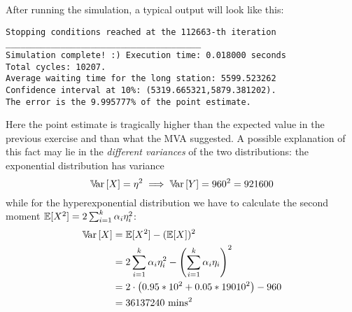 \documentclass[12pt]{article}
\begin{document}
After running the simulation, a typical output will look like this:
\begin{verbatim}
Stopping conditions reached at the 112663-th iteration
_______________________________________
Simulation complete! :) Execution time: 0.018000 seconds
Total cycles: 10207.
Average waiting time for the long station: 5599.523262
Confidence interval at 10%: (5319.665321,5879.381202).
The error is the 9.995777% of the point estimate.
\end{verbatim}
Here the point estimate is tragically higher than the expected value in the previous exercise and than what the MVA suggested. A possible explanation of this fact may lie in the \emph{different variances} of the two distributions: the exponential distribution has variance
\begin{equation*}
	\mathbb{V}\!\mathrm{ar}\,[X]=\eta^{2}\implies\mathbb{V}\!\mathrm{ar}\,[Y]=960^{2}=921600
\end{equation*}
while for the hyperexponential distribution we have to calculate the second moment $\mathbb{E}[X^{2}]=2\sum_{i=1}^{k}\alpha_{i}\eta_i^2$:
\begin{align*}
	\mathbb{V}\!\mathrm{ar}\,[X]&=\mathbb{E}[X^{2}]-(\mathbb{E}[X])^{2}\\
	&=2\sum_{i=1}^{k}\alpha_{i}\eta_i^2-\left(\sum_{i=1}^{k}\alpha_i\eta_i\right)^{2}\\
	&=2\cdot\left(0.95*10^{2}+0.05*19010^2\right)-960\\
	&=36137240\text{ mins}^2
\end{align*}
\end{document}
